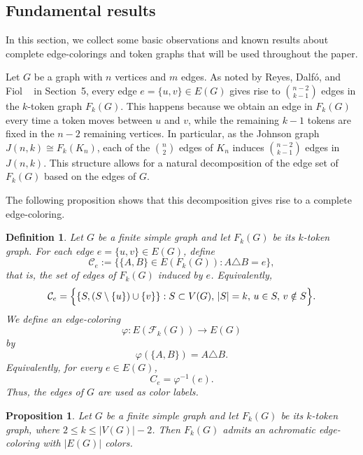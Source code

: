 \documentclass{article}
\newtheorem{definition}[theorem]{Definition}
\newtheorem{proposition}[theorem]{Proposition}
\begin{document}
\subsection{Fundamental results}

In this section, we collect some basic observations and known results about complete edge-colorings and token graphs that will be used throughout the paper.

Let $ G $ be a graph with $ n $ vertices and $ m $ edges. As noted by Reyes, Dalfó, and Fiol ~\cite{rdf24} in Section~5, every edge $ e = \{u, v\} \in E(G) $ gives rise to $ \binom{n-2}{k-1} $ edges in the $k$-token graph $ F_k(G) $. This happens because we obtain an edge in $ F_k(G) $ every time a token moves between $ u $ and $ v $, while the remaining $ k - 1 $ tokens are fixed in the $ n - 2 $ remaining vertices. In particular, as the Johnson graph $ J(n,k) \cong F_k(K_n) $, each of the $ \binom{n}{2} $ edges of $ K_n $ induces $ \binom{n-2}{k-1} $ edges in $ J(n,k) $. This structure allows for a natural decomposition of the edge set of $ F_k(G) $ based on the edges of $ G $.

The following proposition shows that this decomposition gives rise to a complete edge-coloring.

\begin{definition}
Let $G$ be a finite simple graph and let $F_k(G)$ be its $k$-token graph. 
For each edge $e=\{u,v\} \in E(G)$, define
$$
\mathcal{C}_e := \{\{A,B\} \in E(F_k(G)) : A \triangle B = e\},
$$
that is, the set of edges of $F_k(G)$ induced by $e$. Equivalently,
$$
\mathcal{C}_e = \Bigl\{ \{S, (S \setminus \{u\}) \cup \{v\}\} : S \subset V(G),\, |S| = k,\, u \in S,\, v \notin S \Bigr\}.
$$
We define an edge-coloring
$$
\varphi:E(\mathcal{F}_k(G))\longrightarrow E(G)
$$
by
$$
\varphi(\{A,B\})=A\triangle B.
$$
Equivalently, for every $e\in E(G)$,
$$
C_e=\varphi^{-1}(e).
$$
Thus, the edges of $G$ are used as color labels.

\end{definition}

\begin{proposition}
Let $G$ be a finite simple graph and let $F_k(G)$ be its $k$-token graph, where $2 \le k \le |V(G)| - 2$. Then $F_k(G)$ admits an achromatic edge-coloring with $|E(G)|$ colors.\end{proposition}
\end{document}
